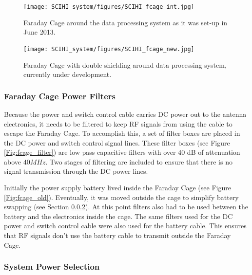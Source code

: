 \begin{figure}[htb]
\centering
\begin{minipage}[b]{0.47\textwidth}
\centering
\texttt{[image: SCIHI\_system/figures/SCIHI\_fcage\_int.jpg]}
\caption{Faraday Cage around the data processing system as it was set-up in June 2013.}
\label{Fig:fcage_int}
\end{minipage}%
\begin{minipage}[b]{0.02\textwidth}
\hspace{1cm}
\end{minipage}%
\begin{minipage}[b]{0.50\textwidth}
\centering
\texttt{[image: SCIHI\_system/figures/SCIHI\_fcage\_new.jpg]}
\caption{Faraday Cage with double shielding around data processing system, currently under development.}
\label{Fig:fcage_new}
\end{minipage}
\end{figure}

\subsubsection{Faraday Cage Power Filters}

Because the power and switch control cable carries DC power out to the antenna electronics, it needs to be filtered to keep RF signals from using the cable to escape the Faraday Cage. To accomplish this, a set of filter boxes are placed in the DC power and switch control signal lines. These filter boxes (see Figure \ref{Fig:fcage_filter}) are low pass capacitive filters with over 40 dB of attenuation above $40 MHz$. Two stages of filtering are included to ensure that there is no signal transmission through the DC power lines. 

Initially the power supply battery lived inside the Faraday Cage (see Figure \ref{Fig:fcage_old}). Eventually, it was moved outside the cage to simplify battery swapping (see Section \ref{Sec:sys_power}). At this point filters also had to be used between the battery and the electronics inside the cage. The same filters used for the DC power and switch control cable were also used for the battery cable. This ensures that RF signals don't use the battery cable to transmit outside the Faraday Cage.  

\subsubsection{System Power Selection} \label{Sec:sys_power}

